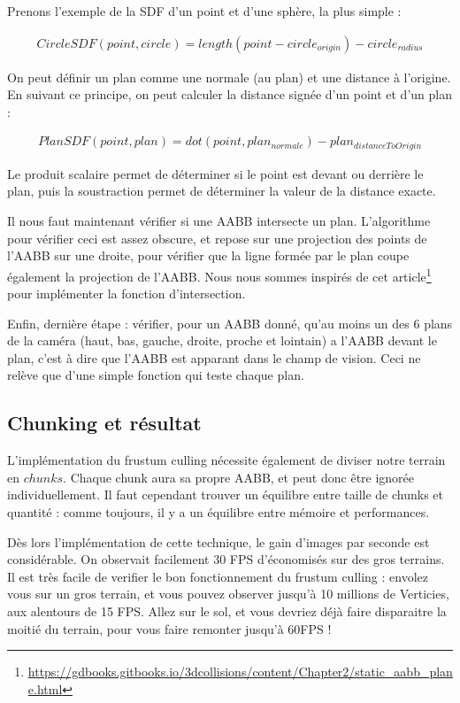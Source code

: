 \documentclass{EPUProjetDi}
\begin{document}
Prenons l'exemple de la SDF d'un point et d'une sphère, la plus simple :

\begin{align*}
	CircleSDF(point, circle) = length(point - circle_{origin}) - circle_{radius}
\end{align*}

On peut définir un plan comme une normale (au plan) et une distance à l'origine.
En suivant ce principe, on peut calculer la distance signée d'un point et d'un plan :

\begin{align*}
	PlanSDF(point, plan) = dot(point, plan_{normale}) - plan_{distanceToOrigin}
\end{align*}

Le produit scalaire permet de déterminer si le point est devant ou derrière le plan, puis la soustraction permet de déterminer la valeur de la distance exacte.

Il nous faut maintenant vérifier si une AABB intersecte un plan.
L'algorithme pour vérifier ceci est assez obscure, et repose sur une projection des points de l'AABB sur une droite, pour vérifier que la ligne formée par le plan coupe également la projection de l'AABB. Nous nous sommes inspirés de cet article\footnote{\url{https://gdbooks.gitbooks.io/3dcollisions/content/Chapter2/static_aabb_plane.html}} pour implémenter la fonction d'intersection.

Enfin, dernière étape : vérifier, pour un AABB donné, qu'au moins un des 6 plans de la caméra (haut, bas, gauche, droite, proche et lointain) a l'AABB devant le plan, c'est à dire que l'AABB est apparant dans le champ de vision. Ceci ne relève que d'une simple fonction qui teste chaque plan.

\subsection{Chunking et résultat}

L'implémentation du frustum culling nécessite également de diviser notre terrain en $chunks$. Chaque chunk aura sa propre AABB, et peut donc être ignorée individuellement. Il faut cependant trouver un équilibre entre taille de chunks et quantité : comme toujours, il y a un équilibre entre mémoire et performances.

Dès lors l'implémentation de cette technique, le gain d'images par seconde est considérable. On observait facilement 30 FPS d'économisés sur des gros terrains.
Il est très facile de verifier le bon fonctionnement du frustum culling : envolez vous sur un gros terrain, et vous pouvez observer jusqu'à 10 millions de Verticies, aux alentours de 15 FPS. Allez sur le sol, et vous devriez déjà faire disparaitre la moitié du terrain, pour vous faire remonter jusqu'à 60FPS !
\end{document}
